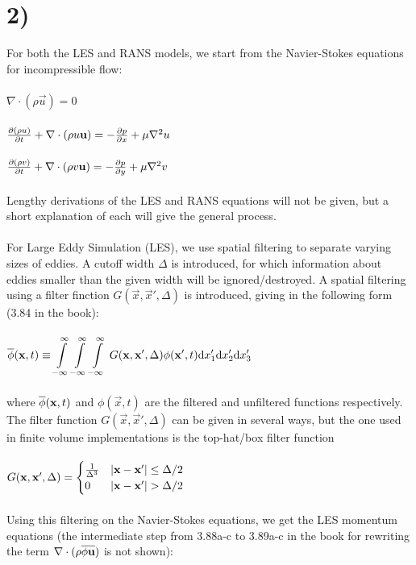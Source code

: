 \documentclass[a4paper,english,11pt,twoside]{article}
\begin{document}
\section*{2)}
For both the LES and RANS models, we start from the Navier-Stokes equations for incompressible flow:\\
\\
$\nabla\cdot (\rho\vec{u}) = 0$\\
\\
$\frac{\partial (\rho u)}{\partial t} + \nabla\cdot(\rho u \mathbf{u}) = -\frac{\partial p}{\partial x} + \mu\nabla^2u$\\
\\
$\frac{\partial (\rho v)}{\partial t} + \nabla\cdot(\rho v \mathbf{u}) = -\frac{\partial p}{\partial y} + \mu\nabla^2v$\\
\\
Lengthy derivations of the LES and RANS equations will not be given, but a short explanation of each will give the general process.\\
\\
For Large Eddy Simulation (LES), we use spatial filtering to separate varying sizes of eddies. A cutoff width $\Delta$ is introduced, for which information about eddies smaller than the given width will be ignored/destroyed. A spatial filtering using a filter finction $G(\vec{x},\vec{x}', \Delta)$ is introduced, giving in the following form (3.84 in the book):\\
\\
$\overline{\phi}(\mathbf{x},t) \equiv \displaystyle\int\limits_{-\infty}^\infty\int\limits_{-\infty}^\infty\int\limits_{-\infty}^\infty\, G(\mathbf{x},\mathbf{x}', \Delta)\phi(\mathbf{x}', t)\mathrm dx_1'\mathrm dx_2'\mathrm dx_3'$\\
\\
where $\overline{\phi}(\mathbf{x},t)$ and $\phi(\vec{x}, t)$ are the filtered and unfiltered functions respectively. The filter function $G(\vec{x},\vec{x}', \Delta)$ can be given in several ways, but the one used in finite volume implementations is the top-hat/box filter function\\
\\
$
 G(\mathbf{x},\mathbf{x}', \Delta) = 
  \begin{cases} 
   \frac{1}{\Delta^3} & \left|\mathbf{x} - \mathbf{x}'\right| \leq \Delta / 2 \\
   0       & \left|\mathbf{x} - \mathbf{x}'\right| > \Delta / 2
  \end{cases}
$\\
\\
Using this filtering on the Navier-Stokes equations, we get the LES momentum equations (the intermediate step from 3.88a-c to 3.89a-c in the book for rewriting the term $\nabla\cdot(\rho\overline{\phi\mathbf{u}})$ is not shown):\\
\end{document}
